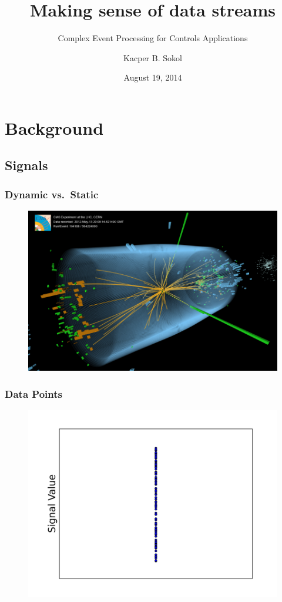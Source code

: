 \documentclass{beamer}
\begin{document}
\title{Making sense of data streams}
\subtitle{Complex Event Processing for Controls Applications}
\author{Kacper B. Sokol}
\date{August 19, 2014}

\begin{frame}[plain]
	\titlepage
\end{frame}



\section{Background} 
  \subsection{Signals}
  \begin{frame}[foot]
    \frametitle{Dynamic vs.\ Static}
    \begin{figure}
      \includegraphics[scale=.7]{./gfx/CMS.png}
    \end{figure}
  \end{frame}

  \begin{frame}[foot]
    \frametitle{Data Points}
    \begin{figure}
      \includegraphics[scale=.5]{./gfx/feature0.png}
    \end{figure}
  \end{frame}
\end{document}
